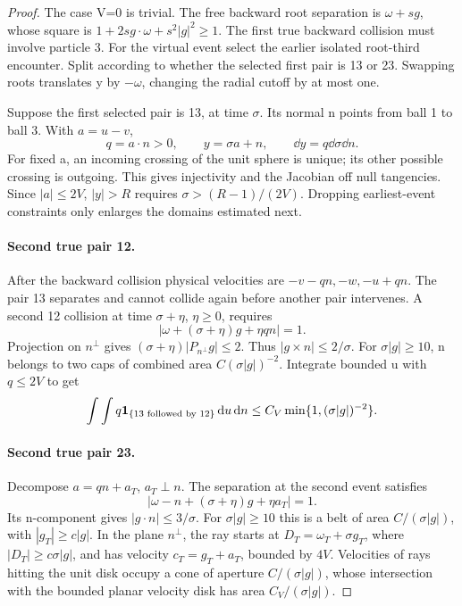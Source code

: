 \documentclass[11pt,letterpaper]{article}
\theoremstyle{remark}\newtheorem{remark}[theorem]{Remark}
\numberwithin{equation}{section}
\begin{document}
\begin{proof}
The case V=0 is trivial. The free backward root separation is $\omega+sg$, whose square is $1+2s g\cdot\omega+s^2|g|^2\ge1$. The first true backward collision must involve particle 3. For the virtual event select the earlier isolated root-third encounter. Split according to whether the selected first pair is 13 or 23. Swapping roots translates y by $-\omega$, changing the radial cutoff by at most one.

Suppose the first selected pair is 13, at time $\sigma$. Its normal n points from ball 1 to ball 3. With $a=u-v$,
\[
 q=a\cdot n>0,\qquad y=\sigma a+n,\qquad \dd y=q\dd\sigma\dd n.
\]
For fixed a, an incoming crossing of the unit sphere is unique; its other possible crossing is outgoing. This gives injectivity and the Jacobian off null tangencies. Since $|a|\le2V$, $|y|>R$ requires $\sigma>(R-1)/(2V)$. Dropping earliest-event constraints only enlarges the domains estimated next.

\paragraph{Second true pair 12.}
After the backward collision physical velocities are $-v-qn,-w,-u+qn$. The pair 13 separates and cannot collide again before another pair intervenes. A second 12 collision at time $\sigma+\eta$, $\eta\ge0$, requires
\[
 |\omega+(\sigma+\eta)g+\eta qn|=1.
\]
Projection on $n^\perp$ gives $(\sigma+\eta)|P_{n^\perp}g|\le2$. Thus $|g\times n|\le2/\sigma$. For $\sigma|g|\ge10$, n belongs to two caps of combined area $C(\sigma|g|)^{-2}$. Integrate bounded u with $q\le2V$ to get
\begin{equation}\label{eq:slot}
 \int\int q\mathbf1_{\{13\text{ followed by }12\}}\,\mathrm d u\,\mathrm d n
          \le C_V\min\{1,(\sigma|g|)^{-2}\}.
\end{equation}

\paragraph{Second true pair 23.}
Decompose $a=qn+a_T$, $a_T\perp n$. The separation at the second event satisfies
\[
 |\omega-n+(\sigma+\eta)g+\eta a_T|=1.
\]
Its n-component gives $|g\cdot n|\le3/\sigma$. For $\sigma|g|\ge10$ this is a belt of area $C/(\sigma|g|)$, with $|g_T|\ge c|g|$. In the plane $n^\perp$, the ray starts at $D_T=\omega_T+\sigma g_T$, where $|D_T|\ge c\sigma|g|$, and has velocity $c_T=g_T+a_T$, bounded by $4V$. Velocities of rays hitting the unit disk occupy a cone of aperture $C/(\sigma|g|)$, whose intersection with the bounded planar velocity disk has area $C_V/(\sigma|g|)$.


\end{proof}
\end{document}
